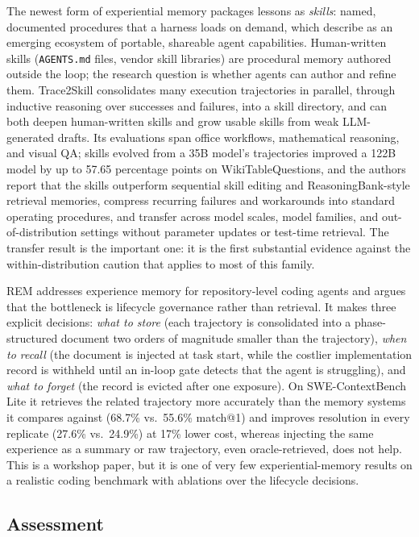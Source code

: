 \documentclass[11pt]{article}
\begin{document}
The newest form of experiential memory packages lessons as \emph{skills}: named, documented procedures that a harness loads on demand, which \citet{huang2026secondhalf} describe as an emerging ecosystem of portable, shareable agent capabilities. Human-written skills (\texttt{AGENTS.md} files, vendor skill libraries) are procedural memory authored outside the loop; the research question is whether agents can author and refine them. Trace2Skill \citep{ni2026trace2skill} consolidates many execution trajectories in parallel, through inductive reasoning over successes and failures, into a skill directory, and can both deepen human-written skills and grow usable skills from weak LLM-generated drafts. Its evaluations span office workflows, mathematical reasoning, and visual QA; skills evolved from a 35B model's trajectories improved a 122B model by up to 57.65 percentage points on WikiTableQuestions, and the authors report that the skills outperform sequential skill editing and ReasoningBank-style retrieval memories, compress recurring failures and workarounds into standard operating procedures, and transfer across model scales, model families, and out-of-distribution settings without parameter updates or test-time retrieval. The transfer result is the important one: it is the first substantial evidence against the within-distribution caution that applies to most of this family.

REM \citep{chen2026rem} addresses experience memory for repository-level coding agents and argues that the bottleneck is lifecycle governance rather than retrieval. It makes three explicit decisions: \emph{what to store} (each trajectory is consolidated into a phase-structured document two orders of magnitude smaller than the trajectory), \emph{when to recall} (the document is injected at task start, while the costlier implementation record is withheld until an in-loop gate detects that the agent is struggling), and \emph{what to forget} (the record is evicted after one exposure). On SWE-ContextBench Lite it retrieves the related trajectory more accurately than the memory systems it compares against (68.7\% vs.\ 55.6\% match@1) and improves resolution in every replicate (27.6\% vs.\ 24.9\%) at 17\% lower cost, whereas injecting the same experience as a summary or raw trajectory, even oracle-retrieved, does not help. This is a workshop paper, but it is one of very few experiential-memory results on a realistic coding benchmark with ablations over the lifecycle decisions.

\subsection{Assessment}
\end{document}
